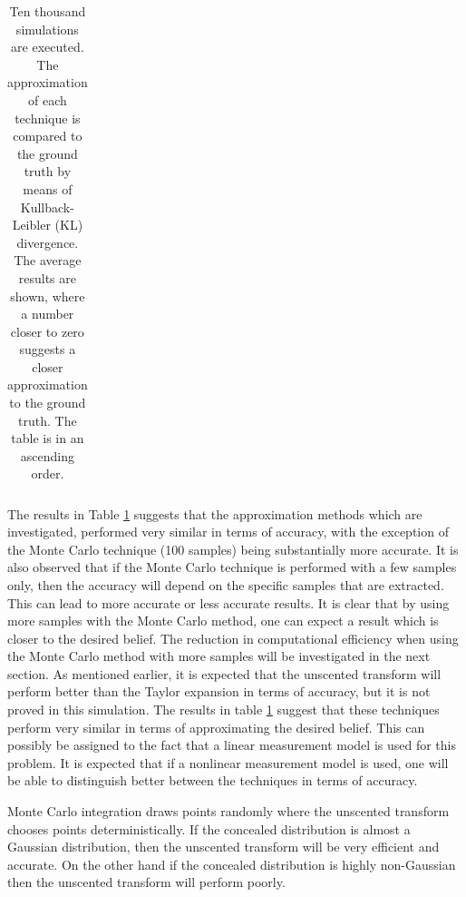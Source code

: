 \documentclass[12pt,oneside,openany,a4paper, %
afrikaans,english,
]{memoir}
\numberwithin{equation}{chapter}
\begin{document}
{\begin{table}[H]
\begin{tabular}{ |l|r| }
\hline
\end{tabular}
\caption[The relative accuracy of each technique measured with Kullback-leibler divergence]{Ten thousand simulations are executed. The approximation of each technique is compared to the ground truth by means of Kullback-Leibler (KL) divergence. The average results are shown, where a number closer to zero suggests a closer approximation to the ground truth. The table is in an ascending order.}
\label{table:klresults} 
\end{table}
The results in Table \ref{table:klresults} suggests that the approximation methods which are investigated, performed very similar in terms of accuracy, with the exception of the Monte Carlo technique (100 samples) being substantially more accurate. It is also observed that if the Monte Carlo technique is performed with a few samples only, then the accuracy will depend on the specific samples that are extracted. This can lead to more accurate or less accurate results. It is clear that by using more samples with the Monte Carlo method, one can expect a result which is closer to the desired belief. The reduction in computational efficiency when using the Monte Carlo method with more samples will be investigated in the next section. As mentioned earlier, it is expected that the unscented transform will perform better than the Taylor expansion in terms of accuracy, but it is not proved in this simulation. The results in table \ref{table:klresults} suggest that these techniques perform very similar in terms of approximating the desired belief. This can possibly be assigned to the fact that a linear measurement model is used for this problem. It is expected that if a nonlinear measurement model is used, one will be able to distinguish better between the techniques in terms of accuracy.

Monte Carlo integration draws points randomly where the unscented transform chooses points deterministically. If the concealed distribution is almost a Gaussian distribution, then the unscented transform will be very efficient and accurate. On the other hand if the concealed distribution is highly non-Gaussian then the unscented transform will perform poorly.
\pagebreak

}
\end{document}
